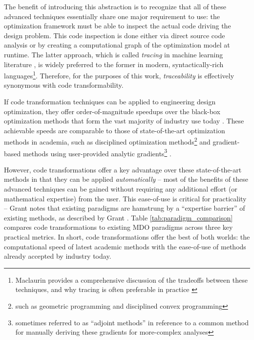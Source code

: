 \documentclass[12pt,vi,oneside,table]{report}
\begin{document}
    The benefit of introducing this abstraction is to recognize that all of these advanced techniques essentially share one major requirement to use: the optimization framework must be able to inspect the actual code driving the design problem. This code inspection is done either via direct source code analysis or by creating a computational graph of the optimization model at runtime. The latter approach, which is called \textit{tracing} in machine learning literature \cite{jax, frostig_compiling_2018, baydin_automatic_2018}, is widely preferred to the former in modern, syntactically-rich languages\footnote{Maclaurin provides a comprehensive discussion of the tradeoffs between these techniques, and why tracing is often preferable in practice \cite{maclaurin_modeling_2016}}. Therefore, for the purposes of this work, \textit{traceability} is effectively synonymous with code transformability.

    If code transformation techniques can be applied to engineering design optimization, they offer order-of-magnitude speedups over the black-box optimization methods that form the vast majority of industry use today \cite{martins_engineering_2021, lavin_simulation_2022}. These achievable speeds are comparable to those of state-of-the-art optimization methods in academia, such as disciplined optimization methods\footnote{such as geometric programming and disciplined convex programming} \cite{grant_disciplined_2006, gpkit, boyd_convex_2004, agrawal_disciplined_2019} and gradient-based methods using user-provided analytic gradients\footnote{sometimes referred to as ``adjoint methods'' in reference to a common method for manually deriving these gradients for more-complex analyses} \cite{gray_openmdao_2019, kenway_effective_2019, innes_don_2019}.

    However, code transformations offer a key advantage over these state-of-the-art methods in that they can be applied \textit{automatically} -- most of the benefits of these advanced techniques can be gained without requiring any additional effort (or mathematical expertise) from the user. This ease-of-use is critical for practicality -- Grant notes that existing paradigms are hamstrung by a ``expertise barrier'' of existing methods, as described by Grant \cite{grant_disciplined_2006}. Table \ref{tab:paradigm_comparison} compares code transformations to existing MDO paradigms across three key practical metrics. In short, code transformations offer the best of both worlds: the computational speed of latest academic methods with the ease-of-use of methods already accepted by industry today.
\end{document}
